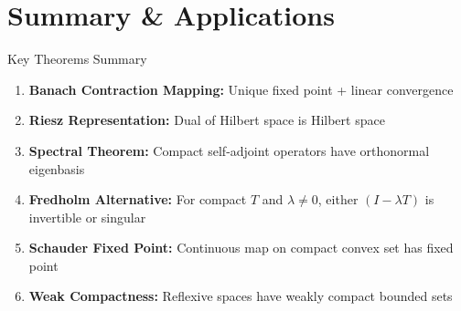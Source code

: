 \documentclass[aspectratio=169,10pt]{beamer}
\begin{document}

\section{Summary \& Applications}

\begin{frame}[allowframebreaks]{Key Theorems Summary}
  \begin{enumerate}
    \item \textbf{Banach Contraction Mapping:} Unique fixed point + linear convergence

    \item \textbf{Riesz Representation:} Dual of Hilbert space is Hilbert space

    \item \textbf{Spectral Theorem:} Compact self-adjoint operators have orthonormal eigenbasis

    \item \textbf{Fredholm Alternative:} For compact $T$ and $\lambda \neq 0$, either $(I - \lambda T)$ is invertible or singular

    \item \textbf{Schauder Fixed Point:} Continuous map on compact convex set has fixed point

    \item \textbf{Weak Compactness:} Reflexive spaces have weakly compact bounded sets
  \end{enumerate}
\end{frame}
\end{document}
